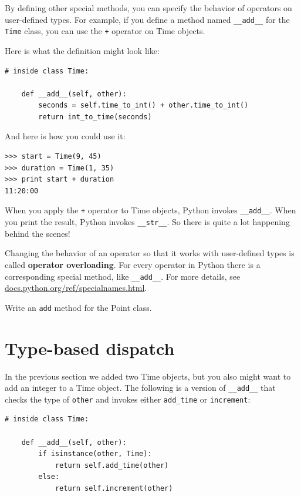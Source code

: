 \documentclass[10pt]{book}
\begin{document}
\begin{CJK}{UTF8}{gbsn}
By defining other special methods, you can specify the behavior
of operators on user-defined types.  For example, if you define
a method named \verb"__add__" for the {\tt Time} class, you can use the
{\tt +} operator on Time objects.

Here is what the definition might look like:

\begin{verbatim}
# inside class Time:

    def __add__(self, other):
        seconds = self.time_to_int() + other.time_to_int()
        return int_to_time(seconds)
\end{verbatim}
%
And here is how you could use it:

\begin{verbatim}
>>> start = Time(9, 45)
>>> duration = Time(1, 35)
>>> print start + duration
11:20:00
\end{verbatim}
%
When you apply the {\tt +} operator to Time objects, Python invokes
\verb"__add__".  When you print the result, Python invokes 
\verb"__str__".  So there is quite a lot happening behind the scenes!

Changing the behavior of an operator so that it works with
user-defined types is called {\bf operator overloading}.  For every
operator in Python there is a corresponding special method, like 
\verb"__add__".  For more details, see
\url{docs.python.org/ref/specialnames.html}.

\begin{exercise}

Write an {\tt add} method for the Point class.  

\end{exercise}


\section{Type-based dispatch}

In the previous section we added two Time objects, but you
also might want to add an integer to a Time object.  The
following is a version of \verb"__add__"
that checks the type of {\tt other} and invokes either
\verb"add_time" or {\tt increment}:

\begin{verbatim}
# inside class Time:

    def __add__(self, other):
        if isinstance(other, Time):
            return self.add_time(other)
        else:
            return self.increment(other)


\end{verbatim}
\end{CJK}
\end{document}
